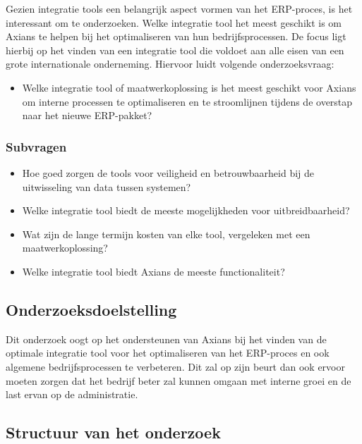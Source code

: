 Gezien integratie tools een belangrijk aspect vormen van het ERP-proces, is het interessant om te onderzoeken. Welke integratie tool het meest geschikt is om Axians te helpen bij het optimaliseren van hun bedrijfsprocessen. De focus ligt hierbij op het vinden van een integratie tool die voldoet aan alle eisen van een grote internationale onderneming. Hiervoor luidt volgende onderzoeksvraag:

\begin{itemize}
  \item Welke integratie tool of maatwerkoplossing is het meest geschikt voor Axians om interne processen te optimaliseren en te stroomlijnen tijdens de overstap naar het nieuwe ERP-pakket?
\end{itemize}

\subsubsection{Subvragen}
\label{sec:Subvragen}
\begin{itemize}
  \item Hoe goed zorgen de tools voor veiligheid en betrouwbaarheid bij de uitwisseling van data tussen systemen?
  \item Welke integratie tool biedt de meeste mogelijkheden voor uitbreidbaarheid?
  \item Wat zijn de lange termijn kosten van elke tool, vergeleken met een maatwerkoplossing?
  \item Welke integratie tool biedt Axians de meeste functionaliteit?
\end{itemize}
 
\subsection{Onderzoeksdoelstelling}
\label{sec:Onderzoeksdoel}

Dit onderzoek oogt op het ondersteunen van Axians bij het vinden van de optimale integratie tool voor het optimaliseren van het ERP-proces en ook algemene bedrijfsprocessen te verbeteren. Dit zal op zijn beurt dan ook ervoor moeten zorgen dat het bedrijf beter zal kunnen omgaan met interne groei en de last ervan op de administratie.

\subsection{Structuur van het onderzoek}
\label{sec:Structuur van het onderzoek}

